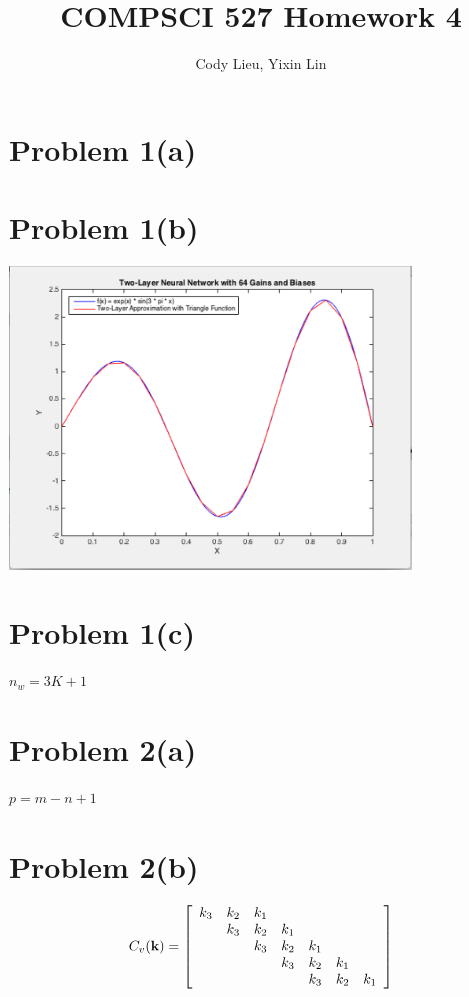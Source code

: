 \documentclass{article}
\author{Cody Lieu, Yixin Lin}
\title{COMPSCI 527 Homework 4}
\begin{document}
\maketitle

\section*{Problem 1(a)}


\section*{Problem 1(b)}


\includegraphics[width=0.8\textwidth]{1b.png}

\section*{Problem 1(c)}

$n_w = 3K + 1$

\section*{Problem 2(a)}

$p = m - n + 1$

\section*{Problem 2(b)}

\[
C_v(\textbf{k}) = \left[\begin{array}{*{7}c}
 k_3 & k_2 & k_1 &  &  &  & \\
 & k_3 & k_2 & k_1 & & &\\
 &  & k_3 & k_2 & k_1 & & \\
 &  &  & k_3 & k_2 & k_1 &\\
 & & & & k_3 & k_2 & k_1
\end{array}\right]
\]
\end{document}
